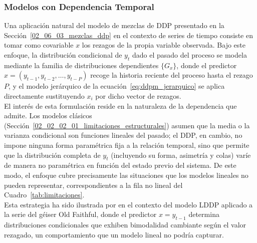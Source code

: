\subsubsection{Modelos con Dependencia Temporal}
\label{02_06_03_01_dependencia_temporal}
Una aplicación natural del modelo de mezclas de DDP presentado en la Sección~\ref{02_06_03_mezclas_ddp} en el contexto de series de tiempo consiste en tomar como covariable $x$ los rezagos de la propia variable observada. Bajo este enfoque, la distribución condicional de $y_t$ dado el pasado del proceso se modela mediante la familia de distribuciones dependientes $\{G_x\}$, donde el predictor $x = (y_{t-1}, y_{t-2}, \dots, y_{t-P})$ recoge la historia reciente del proceso hasta el rezago $P$, y el modelo jerárquico de la ecuación~\eqref{eq:ddpm_jerarquico} se aplica directamente sustituyendo $x_i$ por dicho vector de rezagos.\\

El interés de esta formulación reside en la naturaleza de la dependencia que admite. Los modelos clásicos (Sección~\ref{02_02_02_01_limitaciones_estructurales}) asumen que la media o la varianza condicional son funciones lineales del pasado; el DDP, en cambio, no impone ninguna forma paramétrica fija a la relación temporal, sino que permite que la distribución completa de $y_t$ (incluyendo su forma, asimetría y colas) varíe de manera no paramétrica en función del estado previo del sistema. De este modo, el enfoque cubre precisamente las situaciones que los modelos lineales no pueden representar, correspondientes a la fila no lineal del Cuadro~\ref{tab:limitaciones}.\\

Esta estrategia ha sido ilustrada por \cite{02_06_quintana2022dependent} en el contexto del modelo LDDP aplicado a la serie del géiser Old Faithful, donde el predictor $x = y_{t-1}$ determina distribuciones condicionales que exhiben bimodalidad cambiante según el valor rezagado, un comportamiento que un modelo lineal no podría capturar.